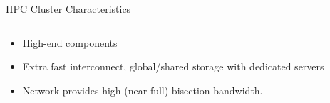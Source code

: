 \documentclass[compress,11pt,xcolor=svgnames,aspectratio=169]{beamer}
\begin{document}
\begin{frame}[fragile]{HPC Cluster Characteristics}

\begin{columns}

\begin{column}{0.32\textwidth}

\begin{itemize}
\setlength\itemsep{0.6cm}
  \item High-end components
  \item Extra fast interconnect, global/shared storage with dedicated servers
  \item Network provides high (near-full) bisection bandwidth.
\end{itemize}

\end{column}

\begin{column}{0.6\textwidth}
\begin{center}
\end{center}
\end{column}

\end{columns}

\end{frame}
\end{document}
